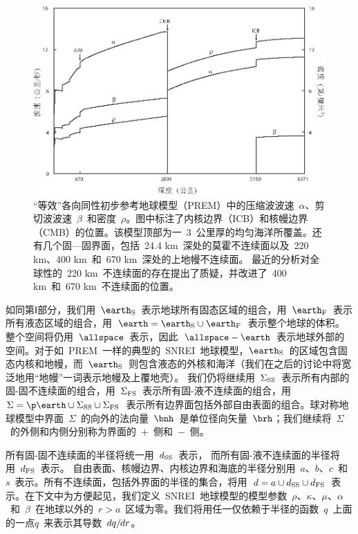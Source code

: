 \begin{figure}[!t]
\begin{center}
\includegraphics{../figures/chap08/fig01.eps}
\end{center}
\caption[PREM model]{\label{fig:prem}
“等效”各向同性初步参考地球模型（PREM）中的压缩波波速~$\alpha$、剪切波波速~$\beta$~和密度~$\rho$。图中标注了内核边界（ICB）和核幔边界（CMB）的位置。该模型顶部为一~3~公里厚的均匀海洋所覆盖。还有几个固—固界面，包括~24.4 km~深处的莫霍不连续面以及~220 km、400 km~和~670 km~深处的上地幔不连续面。
%
%
最近的分析对全球性的~220 km~不连续面的存在提出了质疑，并改进了~400 km~和~670 km~不连续面的位置。}
\end{figure}
如同第Ⅰ部分，我们用~$\earth_{\rm S}$~表示地球所有固态区域的组合，用~$\earth_{\rm F}$~表示所有液态区域的组合，用~$\earth=\earth_{\rm S}\cup\earth_{\rm F}$~表示整个地球的体积。整个空间将仍用~$\allspace$~表示，因此~$\allspace -\earth$~表示地球外部的空间。对于如~PREM~一样的典型的~SNREI~地球模型，$\earth_{\rm S}$~的区域包含固态内核和地幔，而~$\earth_{\rm S}$~则包含液态的外核和海洋（我们在之后的讨论中将宽泛地用“地幔”一词表示地幔及上覆地壳）。
%
%
%
%
我们仍将继续用~$\Sigma_{\rm SS}$~表示所有内部的固-固不连续面的组合，用~$\Sigma_{\rm FS}$~表示所有固-液不连续面的组合，用~$\Sigma=\p\earth\cup\Sigma_{\rm SS}\cup\Sigma_{\rm FS}$~表示所有边界面包括外部自由表面的组合。球对称地球模型中界面~$\Sigma$~的向外的法向量~$\bnh$~是单位径向矢量~$\brh$；我们继续将~$\Sigma$~的外侧和内侧分别称为界面的~$+$~侧和~$-$~侧。

所有固-固不连续面的半径将统一用~$d_{\rm SS}$~表示，
%
而所有固-液不连续面的半径将用~$d_{\rm FS}$~表示。
%
自由表面、核幔边界、内核边界和海底的半径分别用~$a$、$b$、$c$~和~$s$~表示。所有不连续面，包括外界面的半径的集合，将用~$d=a\cup d_{\rm SS}\cup d_{\rm FS}$~表示。在下文中为方便起见，我们定义~SNREI~地球模型的模型参数~$\rho$、$\kappa$、$\mu$、$\alpha$~和~$\beta$~在地球以外的~$r > a$~区域为零。我们将用任一仅依赖于半径的函数~$q$~上面的一点$\dot{q}$~来表示其导数~$dq /\hspace{-0.3 mm} dr$。
%
%
%
%

